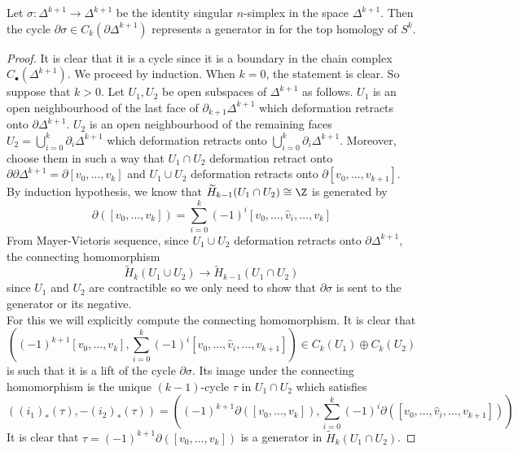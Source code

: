 \documentclass[a4paper]{article}
\begin{document}
\begin{prp}{}{} Let $\sigma:\Delta^{k+1}\to\Delta^{k+1}$ be the identity singular $n$-simplex in the space $\Delta^{k+1}$. Then the cycle $\partial\sigma\in C_k(\partial\Delta^{k+1})$ represents a generator in for the top homology of $S^k$. 
\begin{proof}
It is clear that it is a cycle since it is a boundary in the chain complex $C_\bullet(\Delta^{k+1})$. We proceed by induction. When $k=0$, the statement is clear. So suppose that $k>0$. Let $U_1,U_2$ be open subspaces of $\Delta^{k+1}$ as follows. $U_1$ is an open neighbourhood of the last face of $\partial_{k+1}\Delta^{k+1}$ which deformation retracts onto $\partial\Delta^{k+1}$. $U_2$ is an open neighbourhood of the remaining faces $U_2=\bigcup_{i=0}^k\partial_i\Delta^{k+1}$ which deformation retracts onto $\bigcup_{i=0}^k\partial_i\Delta^{k+1}$. Moreover, choose them in such a way that $U_1\cap U_2$ deformation retract onto $\partial\partial\Delta^{k+1}=\partial[v_0,\dots,v_k]$ and $U_1\cup U_2$ deformation retracts onto $\partial[v_0,\dots,v_{k+1}]$. By induction hypothesis, we know that $\widetilde{H}_{k-1}(U_1\cap U_2)\cong\Z$ is generated by $$\partial([v_0,\dots,v_k])=\sum_{i=0}^k(-1)^i[v_0,\dots,\hat{v}_i,\dots,v_k]$$ From Mayer-Vietoris sequence, since $U_1\cup U_2$ deformation retracts onto $\partial\Delta^{k+1}$, the connecting homomorphism $$\widetilde{H}_k(U_1\cup U_2)\to\widetilde{H}_{k-1}(U_1\cap U_2)$$ since $U_1$ and $U_2$ are contractible so we only need to show that $\partial\sigma$ is sent to the generator or its negative. \\

For this we will explicitly compute the connecting homomorphism. It is clear that $$\left((-1)^{k+1}[v_0,\dots,v_k],\sum_{i=0}^k(-1)^i[v_0,\dots,\hat{v}_i,\dots,v_{k+1}]\right)\in C_k(U_1)\oplus C_k(U_2)$$ is such that it is a lift of the cycle $\partial\sigma$. Its image under the connecting homomorphism is the unique $(k-1)$-cycle $\tau$ in $U_1\cap U_2$ which satisfies $$\left((i_1)_\ast(\tau),-(i_2)_\ast(\tau)\right)=\left((-1)^{k+1}\partial([v_0,\dots,v_k]),\sum_{i=0}^k(-1)^i\partial([v_0,\dots,\hat{v}_i,\dots,v_{k+1}])\right)$$ It is clear that $\tau=(-1)^{k+1}\partial([v_0,\dots,v_k])$ is a generator in $\widetilde{H}_k(U_1\cap U_2)$. 
\end{proof}
\end{prp}
\end{document}
